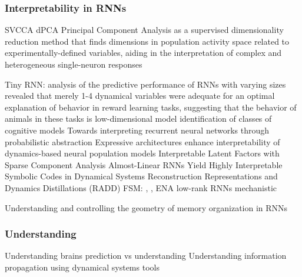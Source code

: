 \documentclass{article}
\theoremstyle{definition} \newtheorem{definition}{Definition}  \newtheorem{example}{Example}
\theoremstyle{remark} \newtheorem{remark}{Remark}
\newcounter{ct}
\begin{document}
\subsubsection{Interpretability in RNNs}
SVCCA\citep{raghu2017svcca}
dPCA\citep{kobak2016demixed} Principal Component Analysis as a supervised dimensionality reduction method that finds dimensions in population activity space related to experimentally-defined variables, aiding in the interpretation of complex and heterogeneous single-neuron responses

Tiny RNN\citep{jian2023tinyrnn}: analysis of the predictive performance of RNNs with varying sizes revealed that merely 1-4 dynamical variables were adequate for an optimal explanation of behavior in reward learning tasks, suggesting that the behavior of animals in these tasks is low-dimensional
model identification of classes of cognitive models\citep{rmus2024artificial}
Towards interpreting recurrent neural networks through probabilistic abstraction \citep{dong2020towards}
Expressive architectures enhance interpretability of dynamics-based neural population models \citep{sedler2023expressive}
Interpretable Latent Factors with Sparse Component Analysis \citep{zimnik2024identifying}
Almost-Linear RNNs Yield Highly Interpretable Symbolic Codes in Dynamical Systems Reconstruction \citep{brenner2024almost}
\citep{he2024multilevel}
\citep{schaeffer2020reverseengineering} Representations and Dynamics Distillations (RADD)
\citep{turner2023simplicity}
FSM: \citep{oliva2019fsm}, \citep{cotteret2024fsm},  ENA \citep{ceni2020interpreting}
low-rank RNNs \citep{beiran2021shaping, valente2022extracting, valente2022probing}
mechanistic \citep{qian2024partial}
\citep{Nassar2018b}

Understanding and controlling the geometry of memory organization in RNNs \citep{haputhanthri2025understanding}


\subsubsection{Understanding}\label{sec:understanding}
\citep{deregt2017understanding}
\citep{potochnik2017idealization}
\citep{guest2023logical}
%
Understanding brains \citep{marder2015understanding} \citep{lindsay2023testing} \citep{barman2024towards} \citep{dowling2018understanding}
prediction vs understanding \citep{chirimuuta2021prediction}
%
Understanding information propagation using dynamical systems tools \citep{vogt2022lyapunov}
\end{document}
